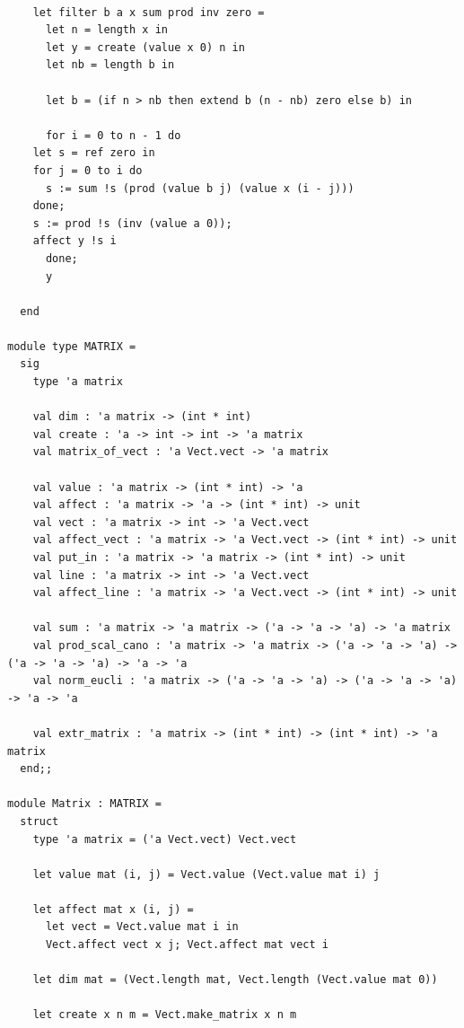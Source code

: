 \documentclass[a4paper,10pt]{report}
\theoremstyle{break}
\begin{document}
    \begin{lstlisting}

    let filter b a x sum prod inv zero =
      let n = length x in
      let y = create (value x 0) n in
      let nb = length b in
			
      let b = (if n > nb then extend b (n - nb) zero else b) in	
			
      for i = 0 to n - 1 do
	let s = ref zero in
	for j = 0 to i do
	  s := sum !s (prod (value b j) (value x (i - j)))
	done;
	s := prod !s (inv (value a 0));
	affect y !s i
      done;
      y

  end

module type MATRIX =
  sig
    type 'a matrix

    val dim : 'a matrix -> (int * int)
    val create : 'a -> int -> int -> 'a matrix
    val matrix_of_vect : 'a Vect.vect -> 'a matrix

    val value : 'a matrix -> (int * int) -> 'a
    val affect : 'a matrix -> 'a -> (int * int) -> unit
    val vect : 'a matrix -> int -> 'a Vect.vect
    val affect_vect : 'a matrix -> 'a Vect.vect -> (int * int) -> unit
    val put_in : 'a matrix -> 'a matrix -> (int * int) -> unit
    val line : 'a matrix -> int -> 'a Vect.vect
    val affect_line : 'a matrix -> 'a Vect.vect -> (int * int) -> unit

    val sum : 'a matrix -> 'a matrix -> ('a -> 'a -> 'a) -> 'a matrix
    val prod_scal_cano : 'a matrix -> 'a matrix -> ('a -> 'a -> 'a) -> ('a -> 'a -> 'a) -> 'a -> 'a
    val norm_eucli : 'a matrix -> ('a -> 'a -> 'a) -> ('a -> 'a -> 'a) -> 'a -> 'a

    val extr_matrix : 'a matrix -> (int * int) -> (int * int) -> 'a matrix
  end;;

module Matrix : MATRIX =
  struct
    type 'a matrix = ('a Vect.vect) Vect.vect

    let value mat (i, j) = Vect.value (Vect.value mat i) j

    let affect mat x (i, j) = 
      let vect = Vect.value mat i in
      Vect.affect vect x j; Vect.affect mat vect i
		
    let dim mat = (Vect.length mat, Vect.length (Vect.value mat 0))
		
    let create x n m = Vect.make_matrix x n m 
	
    \end{lstlisting}
\newpage
\end{document}
